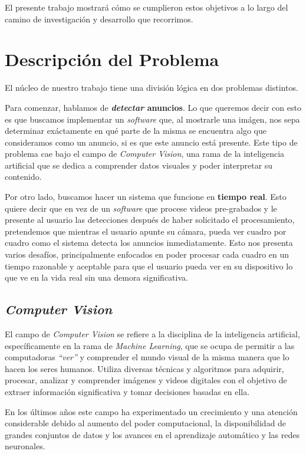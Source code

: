 \documentclass[a4paper]{article}
\begin{document}
El presente trabajo mostrará cómo se cumplieron estos objetivos a lo largo del camino de investigación y desarrollo que recorrimos.

\section{Descripción del Problema}

El núcleo de nuestro trabajo tiene una división lógica en dos problemas distintos.

Para comenzar, hablamos de \textbf{\textit{detectar} anuncios}. Lo que queremos decir con esto es que buscamos implementar un \textit{software} que, al mostrarle una imágen, nos sepa determinar exáctamente en qué parte de la misma se encuentra algo que consideramos como un anuncio, si es que este anuncio está presente.
Este tipo de problema cae bajo el campo de \textit{Computer Vision}, una rama de la inteligencia artificial que se dedica a comprender datos visuales y poder interpretar su contenido.

Por otro lado, buscamos hacer un sistema que funcione en \textbf{tiempo real}. Esto quiere decir que en vez de un \textit{software} que procese videos pre-grabados y le presente al usuario las detecciones después de haber solicitado el procesamiento, pretendemos que mientras el usuario apunte su cámara, pueda ver cuadro por cuadro como el sistema detecta los anuncios inmediatamente.
Esto nos presenta varios desafíos, principalmente enfocados en poder procesar cada cuadro en un tiempo razonable y aceptable para que el usuario pueda ver en su dispositivo lo que ve en la vida real sin una demora significativa.

\subsection{\textit{Computer Vision}}

El campo de \textit{Computer Vision} se refiere a la disciplina de la inteligencia artificial, específicamente en la rama de \textit{Machine Learning}, que se ocupa de permitir a las computadoras \textit{``ver''} y comprender el mundo visual de la misma manera que lo hacen los seres humanos. Utiliza diversas técnicas y algoritmos para adquirir, procesar, analizar y comprender imágenes y videos digitales con el objetivo de extraer información significativa y tomar decisiones basadas en ella.

En los últimos años este campo ha experimentado un crecimiento y una atención considerable debido al aumento del poder computacional, la disponibilidad de grandes conjuntos de datos y los avances en el aprendizaje automático y las redes neuronales.
\end{document}
